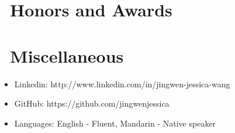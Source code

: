 \documentclass{resume}
\begin{document}
\section{\faHeartO\ Honors and Awards}




\section{\faInfo\ Miscellaneous}
\begin{itemize}[parsep=0.5ex]
  \item Linkedin: http://www.linkedin.com/in/jingwen-jessica-wang
  \item GitHub: https://github.com/jingwenjessica
  \item Languages: English - Fluent, Mandarin - Native speaker
\end{itemize}

\newpage


\end{document}
